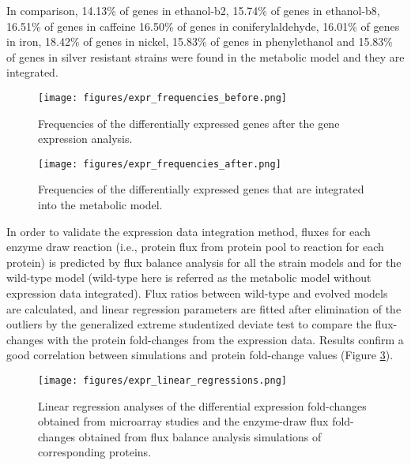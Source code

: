 In comparison, 14.13\% of genes in ethanol-b2, 15.74\% of genes in ethanol-b8, 16.51\% of genes in caffeine	16.50\% of genes in coniferylaldehyde, 16.01\% of genes in iron, 18.42\% of genes	in nickel, 15.83\% of genes in phenylethanol and 15.83\%  of genes in silver resistant strains were found in the metabolic model and they are integrated.

\begin{figure}[H]
  \begin{center}
  \texttt{[image: figures/expr\_frequencies\_before.png]}
  \caption[Frequencies of the differentially expressed genes after the gene expression analysis]{Frequencies of the differentially expressed genes after the gene expression analysis.}
  \label{fig:expr_frequencies_before}
  \end{center}
\end{figure}

\begin{figure}[H]
  \begin{center}
  \texttt{[image: figures/expr\_frequencies\_after.png]}
  \caption[Frequencies of the differentially expressed genes that are integrated into the metabolic model]{Frequencies of the differentially expressed genes that are integrated into the metabolic model.}
  \label{fig:expr_frequencies_after}
  \end{center}
\end{figure}

In order to validate the expression data integration method, fluxes for each enzyme draw reaction (i.e., protein flux from protein pool to reaction for each protein) is predicted by flux balance analysis for all the strain models and for the wild-type model (wild-type here is referred as the metabolic model without expression data integrated). Flux ratios between wild-type and evolved models are calculated, and linear regression parameters are fitted after elimination of the outliers by the generalized extreme studentized deviate test to compare the flux-changes with the protein fold-changes from the expression data. Results confirm a good correlation between simulations and protein fold-change values (Figure \ref{fig:expr_linear_regressions}).

\begin{figure}[H]
  \begin{center}
  \texttt{[image: figures/expr\_linear\_regressions.png]}
  \caption[Linear regression analyses of the fold-changes]{Linear regression analyses of the differential expression fold-changes obtained from microarray studies and the enzyme-draw flux fold-changes obtained from flux balance analysis simulations of corresponding proteins.}
  \label{fig:expr_linear_regressions}
  \end{center}
\end{figure}


